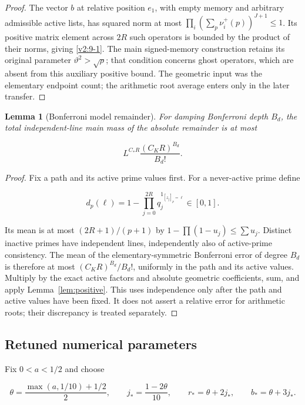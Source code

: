 \documentclass[11pt]{article}
\newtheorem{lemma}[theorem]{Lemma}
\theoremstyle{definition}
\theoremstyle{remark}
\numberwithin{equation}{section}
\begin{document}
\begin{proof}
The vector $b$ at relative position $e_1$, with empty memory and arbitrary admissible active lists, has squared norm at most $\prod_i(\sum_p\nu_i^+(p))^{J+1}\le1$. Its positive matrix element across $2R$ such operators is bounded by the product of their norms, giving \eqref{v2:9-1}. The main signed-memory construction retains its original parameter $\vartheta^2>\sqrt\rho$; that condition concerns ghost operators, which are absent from this auxiliary positive bound. The geometric input was the elementary endpoint count; the arithmetic root average enters only in the later transfer. \end{proof}

\begin{lemma}[Bonferroni model remainder]\label{lem:bonferroni}
For damping Bonferroni depth $B_d$, the total independent-line main mass of the absolute remainder is at most


\begin{equation}\label{v2:9-5}
L^{C_*R}\frac{(C_KR)^{B_d}}{B_d!}.
\end{equation}


\end{lemma}\begin{proof} Fix a path and its active prime values first. For a never-active prime define


\begin{equation}
d_p(\ell)=1-\prod_{j=0}^{2R}q_j^{1_{[z_j]_p=\ell}}\in[0,1].
\end{equation}


Its mean is at most $(2R+1)/(p+1)$ by $1-\prod(1-u_j)\le\sum u_j$. Distinct inactive primes have independent lines, independently also of active-prime consistency. The mean of the elementary-symmetric Bonferroni error of degree $B_d$ is therefore at most $(C_KR)^{B_d}/B_d!$, uniformly in the path and its active values. Multiply by the exact active factors and absolute geometric coefficients, sum, and apply Lemma~\ref{lem:positive}. This uses independence only after the path and active values have been fixed. It does not assert a relative error for arithmetic roots; their discrepancy is treated separately. \end{proof}

\subsection{Retuned numerical parameters}\label{subsec:retune}
Fix $0<a<1/2$ and choose


\begin{equation}
\theta=\frac{\max(a,1/10)+1/2}{2},\qquad
j_*=\frac{1-2\theta}{10},\qquad
r_*=\theta+2j_*,\qquad b_*=\theta+3j_*.
\end{equation}
\end{document}
